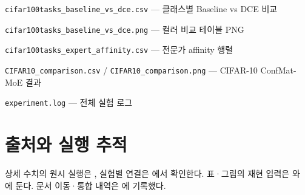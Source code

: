 \par\noindent \textbullet\enspace \texttt{cifar100\allowbreak{}tasks\_\allowbreak{}\allowbreak{}ba\allowbreak{}seline\_\allowbreak{}\allowbreak{}v\allowbreak{}s\_\allowbreak{}\allowbreak{}dce.\allowbreak{}cs\allowbreak{}v} — 클래스별 Baseline vs DCE 비교


\par\noindent \textbullet\enspace \texttt{cifar100\allowbreak{}tasks\_\allowbreak{}\allowbreak{}ba\allowbreak{}seline\_\allowbreak{}\allowbreak{}v\allowbreak{}s\_\allowbreak{}\allowbreak{}dce.\allowbreak{}pn\allowbreak{}g} — 컬러 비교 테이블 PNG


\par\noindent \textbullet\enspace \texttt{cifar100\allowbreak{}tasks\_\allowbreak{}\allowbreak{}ex\allowbreak{}pert\_\allowbreak{}\allowbreak{}aff\allowbreak{}inity.\allowbreak{}cs\allowbreak{}v} — 전문가 affinity 행렬


\par\noindent \textbullet\enspace \texttt{CIFAR10\_\allowbreak{}\allowbreak{}comparis\allowbreak{}on.\allowbreak{}csv} /\allowbreak{} \texttt{CIFAR10\_\allowbreak{}\allowbreak{}comparis\allowbreak{}on.\allowbreak{}png} — CIFAR-10 ConfMat-MoE 결과


\par\noindent \textbullet\enspace \texttt{experime\allowbreak{}nt.\allowbreak{}log} — 전체 실험 로그




\section*{출처와 실행 추적}

상세 수치의 원시 실행은 , 실험별 연결은 에서 확인한다. 표·그림의 재현 입력은 와 에 둔다. 문서 이동·통합 내역은 에 기록했다.


